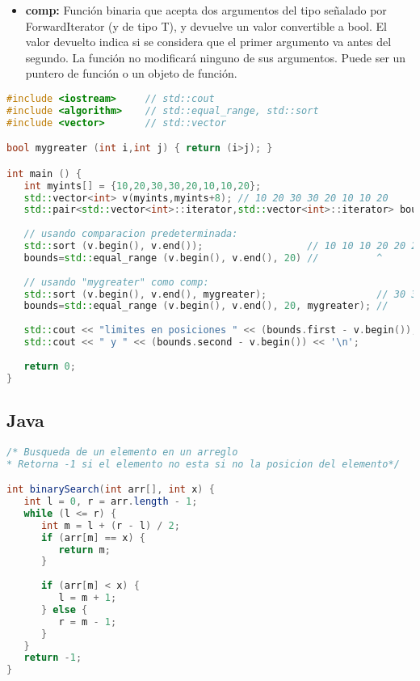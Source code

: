 \begin{enumerate}
\begin{itemize}
	\item \textbf{comp:} Función binaria que acepta dos argumentos del tipo señalado por ForwardIterator (y de tipo T), y devuelve un valor convertible a bool. El valor devuelto indica si se considera que el primer argumento va antes del segundo. La función no modificará ninguno de sus argumentos. Puede ser un puntero de función o un objeto de función.
\end{itemize} 

\begin{lstlisting}[language=C++]
#include <iostream>     // std::cout
#include <algorithm>    // std::equal_range, std::sort
#include <vector>       // std::vector

bool mygreater (int i,int j) { return (i>j); }

int main () {
   int myints[] = {10,20,30,30,20,10,10,20};
   std::vector<int> v(myints,myints+8); // 10 20 30 30 20 10 10 20
   std::pair<std::vector<int>::iterator,std::vector<int>::iterator> bounds;
	
   // usando comparacion predeterminada:
   std::sort (v.begin(), v.end());                  // 10 10 10 20 20 20 30 30
   bounds=std::equal_range (v.begin(), v.end(), 20) //          ^        ^
	
   // usando "mygreater" como comp:
   std::sort (v.begin(), v.end(), mygreater);                   // 30 30 20 20 20 10 10 10
   bounds=std::equal_range (v.begin(), v.end(), 20, mygreater); //       ^        ^
	
   std::cout << "limites en posiciones " << (bounds.first - v.begin());
   std::cout << " y " << (bounds.second - v.begin()) << '\n';
	
   return 0;
}
\end{lstlisting}	
\end{enumerate}

\subsection{Java}
\begin{lstlisting}[language=Java]
/* Busqueda de un elemento en un arreglo
* Retorna -1 si el elemento no esta si no la posicion del elemento*/

int binarySearch(int arr[], int x) {
   int l = 0, r = arr.length - 1;
   while (l <= r) {
      int m = l + (r - l) / 2;
      if (arr[m] == x) {
         return m;
      }
		
      if (arr[m] < x) {
         l = m + 1;
      } else {
         r = m - 1;
      }
   }
   return -1;
}

\end{lstlisting}

